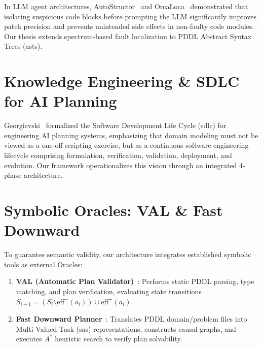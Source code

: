 In LLM agent architectures, AutoStructor~\cite{autostructor2024} and OrcaLoca~\cite{orcaloca2024} demonstrated that isolating suspicious code blocks before prompting the LLM significantly improves patch precision and prevents unintended side effects in non-faulty code modules. Our thesis extends spectrum-based fault localization to PDDL Abstract Syntax Trees (\gls{ast}s).

\section{Knowledge Engineering \& SDLC for AI Planning}
Georgievski~\cite{georgievski2023,georgievski2024} formalized the Software Development Life Cycle (\gls{sdlc}) for engineering AI planning systems, emphasizing that domain modeling must not be viewed as a one-off scripting exercise, but as a continuous software engineering lifecycle comprising formulation, verification, validation, deployment, and evolution. Our framework operationalizes this vision through an integrated 4-phase architecture.

\section{Symbolic Oracles: VAL \& Fast Downward}
To guarantee semantic validity, our architecture integrates established symbolic tools as external Oracles:
\begin{enumerate}
    \item \textbf{VAL (Automatic Plan Validator)}~\cite{howey2004}: Performs static PDDL parsing, type matching, and plan verification, evaluating state transitions $S_{i+1} = (S_i \setminus \text{eff}^-(a_i)) \cup \text{eff}^+(a_i)$.
    \item \textbf{Fast Downward Planner}~\cite{helmert2006}: Translates PDDL domain/problem files into Multi-Valued Task (\gls{sas}) representations, constructs causal graphs, and executes $A^*$ heuristic search to verify plan solvability.
\end{enumerate}
